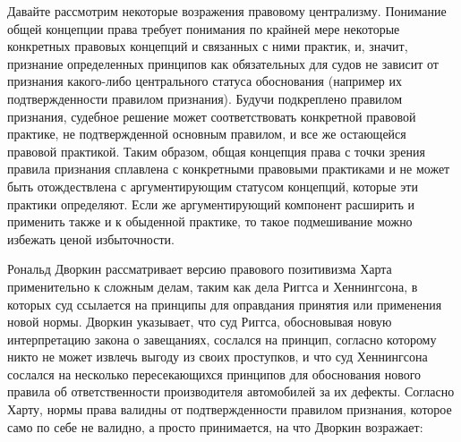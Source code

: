 \documentclass[11pt]{book}
\begin{document}
Давайте рассмотрим некоторые возражения правовому централизму. Понимание общей концепции права требует понимания по крайней мере некоторые конкретных правовых концепций и связанных с ними практик, и, значит, признание определенных принципов как обязательных для судов не зависит от признания какого-либо центрального статуса обоснования (например их подтвержденности правилом признания). Будучи подкреплено правилом признания, судебное решение может соответствовать конкретной правовой практике, не подтвержденной основным правилом, и все же остающейся правовой практикой. Таким образом, общая концепция права с точки зрения правила признания сплавлена с конкретными правовыми практиками и не может быть отождествлена с аргументирующим статусом концепций, которые эти практики определяют. Если же аргументирующий компонент расширить и применить также и к обыденной практике, то такое подмешивание можно избежать ценой избыточности.

Рональд Дворкин рассматривает версию правового позитивизма Харта применительно к сложным делам, таким как дела Риггса и Хеннингсона, в которых суд ссылается на принципы для оправдания принятия или применения новой нормы. Дворкин указывает, что суд Риггса, обосновывая новую интерпретацию закона о завещаниях, сослался на принцип, согласно которому никто не может извлечь выгоду из своих проступков, и что суд Хеннингсона сослался на несколько пересекающихся принципов для обоснования нового правила об ответственности производителя автомобилей за их дефекты. Согласно Харту, нормы права валидны от подтвержденности правилом признания, которое само по себе не валидно, а просто принимается, на что Дворкин возражает:
\end{document}
